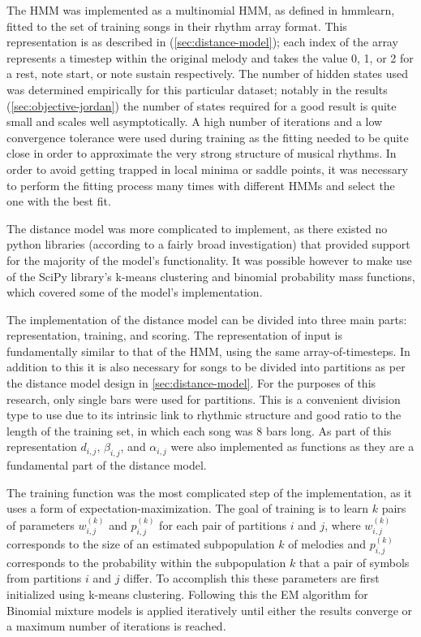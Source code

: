 \documentclass[ author={Stephen Livermore-Tozer},
				supervisor={Dr. Peter Flach},
				degree={MEng},
				title={Algorithmic Co-composition Using Machine Learning},
				subtitle={},
				type={research},
				year={2016} ]{dissertation}
\begin{document}
	The HMM was implemented as a multinomial HMM, as defined in hmmlearn, fitted to the set of training songs in their rhythm array format. This representation is as described in (\ref{sec:distance-model}); each index of the array represents a timestep within the original melody and takes the value 0, 1, or 2 for a rest, note start, or note sustain respectively. The number of hidden states used was determined empirically for this particular dataset; notably in the results (\ref{sec:objective-jordan}) the number of states required for a good result is quite small and scales well asymptotically. A high number of iterations and a low convergence tolerance were used during training as the fitting needed to be quite close in order to approximate the very strong structure of musical rhythms. In order to avoid getting trapped in local minima or saddle points, it was necessary to perform the fitting process many times with different HMMs and select the one with the best fit.
	
	The distance model was more complicated to implement, as there existed no python libraries (according to a fairly broad investigation) that provided support for the majority of the model's functionality. It was possible however to make use of the SciPy library's k-means clustering and binomial probability mass functions, which covered some of the model's implementation. 
	
	The implementation of the distance model can be divided into three main parts: representation, training, and scoring. The representation of input is fundamentally similar to that of the HMM, using the same array-of-timesteps. In addition to this it is also necessary for songs to be divided into partitions as per the distance model design in \ref{sec:distance-model}. For the purposes of this research, only single bars were used for partitions. This is a convenient division type to use due to its intrinsic link to rhythmic structure and good ratio to the length of the training set, in which each song was 8 bars long. As part of this representation $d_{i,j}$, $\beta_{i,j}$, and $\alpha_{i,j}$ were also implemented as functions as they are a fundamental part of the distance model.
	
	The training function was the most complicated step of the implementation, as it uses a form of expectation-maximization. The goal of training is to learn $k$ pairs of parameters $w^{(k)}_{i,j}$ and $p^{(k)}_{i,j}$ for each pair of partitions $i$ and $j$, where $w^{(k)}_{i,j}$ corresponds to the size of an estimated subpopulation $k$ of melodies and $p^{(k)}_{i,j}$ corresponds to the probability within the subpopulation $k$ that a pair of symbols from partitions $i$ and $j$ differ. To accomplish this these parameters are first initialized using k-means clustering. Following this the EM algorithm for Binomial mixture models \cite{bilmes1998gentle} is applied iteratively until either the results converge or a maximum number of iterations is reached. 
	
\end{document}
